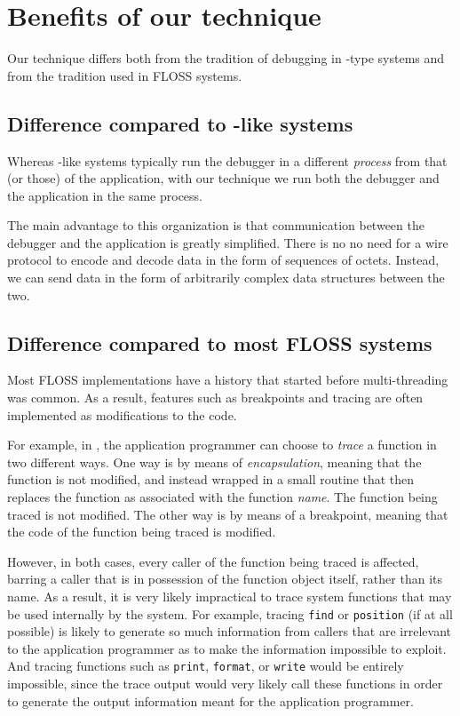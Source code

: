 \section{Benefits of our technique}
\label{sec-benefits}

Our technique differs both from the tradition of debugging in
\unix{}-type systems and from the tradition used in FLOSS
\commonlisp{} systems.

\subsection{Difference compared to \unix{}-like systems}

Whereas \unix{}-like systems typically run the debugger in a different
\emph{process} from that (or those) of the application, with our
technique we run both the debugger and the application in the same
process.

The main advantage to this organization is that communication between
the debugger and the application is greatly simplified.  There is no
no need for a wire protocol to encode and decode data in the form of
sequences of octets.  Instead, we can send data in the form of
arbitrarily complex data structures between the two.  

\subsection{Difference compared to most FLOSS \commonlisp{} systems}

Most FLOSS \commonlisp{} implementations have a history that started
before multi-threading was common.  As a result, features such as
breakpoints and tracing are often implemented as modifications to
the code.

For example, in \sbcl{}, the application programmer can choose to
\emph{trace} a function in two different ways.  One way is by means of
\emph{encapsulation}, meaning that the function is not modified, and
instead wrapped in a small routine that then replaces the function as
associated with the function \emph{name}.  The function being traced
is not modified.  The other way is by means of a breakpoint, meaning
that the code of the function being traced is modified.

However, in both cases, every caller of the function being traced is
affected, barring a caller that is in possession of the function
object itself, rather than its name.  As a result, it is very likely
impractical to trace system functions that may be used internally by
the system.  For example, tracing \texttt{find} or \texttt{position}
(if at all possible) is likely to generate so much information from
callers that are irrelevant to the application programmer as to make
the information impossible to exploit.  And tracing functions such as
\texttt{print}, \texttt{format}, or \texttt{write} would be entirely
impossible, since the trace output would very likely call these
functions in order to generate the output information meant for the
application programmer.

